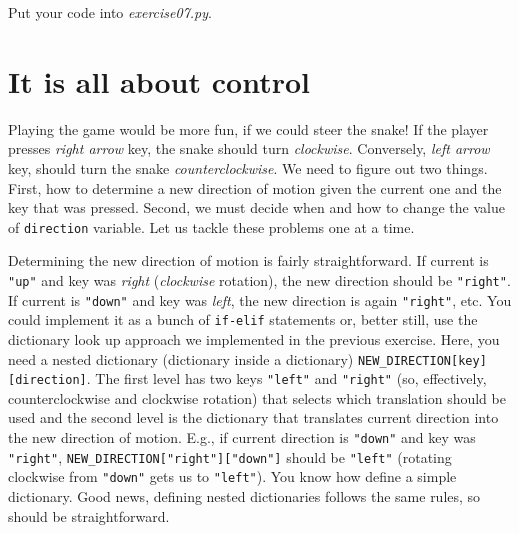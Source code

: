 \documentclass[
]{book}
\begin{document}
Put your code into \emph{exercise07.py}.

\hypertarget{it-is-all-about-control}{%
\section{It is all about control}\label{it-is-all-about-control}}

Playing the game would be more fun, if we could steer the snake! If the player presses \emph{right arrow} key, the snake should turn \emph{clockwise}. Conversely, \emph{left arrow} key, should turn the snake \emph{counterclockwise}. We need to figure out two things. First, how to determine a new direction of motion given the current one and the key that was pressed. Second, we must decide when and how to change the value of \texttt{direction} variable. Let us tackle these problems one at a time.

Determining the new direction of motion is fairly straightforward. If current is \texttt{"up"} and key was \emph{right} (\emph{clockwise} rotation), the new direction should be \texttt{"right"}. If current is \texttt{"down"} and key was \emph{left}, the new direction is again \texttt{"right"}, etc. You could implement it as a bunch of \texttt{if-elif} statements or, better still, use the dictionary look up approach we implemented in the previous exercise. Here, you need a nested dictionary (dictionary inside a dictionary) \texttt{NEW\_DIRECTION{[}key{]}{[}direction{]}}. The first level has two keys \texttt{"left"} and \texttt{"right"} (so, effectively, counterclockwise and clockwise rotation) that selects which translation should be used and the second level is the dictionary that translates current direction into the new direction of motion. E.g., if current direction is \texttt{"down"} and key was \texttt{"right"}, \texttt{NEW\_DIRECTION{[}"right"{]}{[}"down"{]}} should be \texttt{"left"} (rotating clockwise from \texttt{"down"} gets us to \texttt{"left"}). You know how define a simple dictionary. Good news, defining nested dictionaries follows the same rules, so should be straightforward.
\end{document}
